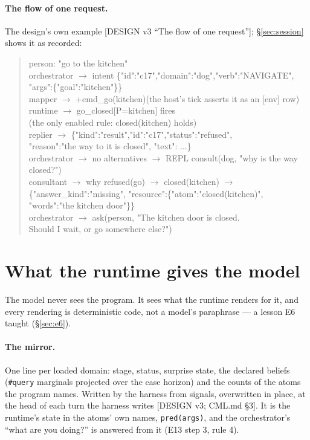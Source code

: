 \documentclass[11pt]{article}
\newcommand{\src}[1]{{\footnotesize\textsf{[#1]}}}
\begin{document}
\paragraph{The flow of one request.} The design's own example \src{DESIGN v3 ``The flow
of one request''}; \S\ref{sec:session} shows it as recorded:
\begin{quote}\footnotesize\ttfamily
person: "go to the kitchen"\\
orchestrator $\to$ intent \{"id":"c17","domain":"dog","verb":"NAVIGATE",\\
\phantom{orchestrator xxxxxxxxx}"args":\{"goal":"kitchen"\}\}\\
mapper \phantom{xxxx}$\to$ +cmd\_go(kitchen)\quad (the host's tick asserts it as an [env] row)\\
runtime \phantom{xxx}$\to$ go\_closed[P=kitchen] fires\\
\phantom{runtime xxxxxxx}(the only enabled rule: closed(kitchen) holds)\\
replier \phantom{xxx}$\to$ \{"kind":"result","id":"c17","status":"refused",\\
\phantom{replier xxxxxxx}"reason":"the way to it is closed", "text": ...\}\\
orchestrator $\to$ no alternatives $\to$ REPL consult(dog, "why is the way closed?")\\
consultant \phantom{x}$\to$ why refused(go) $\to$ closed(kitchen) $\to$\\
\phantom{consultant xxxxx}\{"answer\_kind":"missing", "resource":\{"atom":"closed(kitchen)",\\
\phantom{consultant xxxxxxxxxxx}"words":"the kitchen door"\}\}\\
orchestrator $\to$ ask(person, "The kitchen door is closed.\\
\phantom{orchestrator xxxxxxxxxxxxx}Should I wait, or go somewhere else?")
\end{quote}

\section{What the runtime gives the model}\label{sec:gives}

The model never sees the program. It sees what the runtime renders for it, and every
rendering is deterministic code, not a model's paraphrase --- a lesson E6 taught
(\S\ref{sec:e6}).

\paragraph{The mirror.} One line per loaded domain: stage, status, surprise state, the
declared beliefs (\texttt{\#query} marginals projected over the case horizon) and the
counts of the atoms the program names. Written by the harness from signals, overwritten
in place, at the head of each turn the harness writes \src{DESIGN v3; CML.md \S3}. It is
the runtime's state in the atoms' own names, \texttt{pred(args)}, and the orchestrator's
``what are you doing?'' is answered from it (E13 step 3, rule 4).
\end{document}
